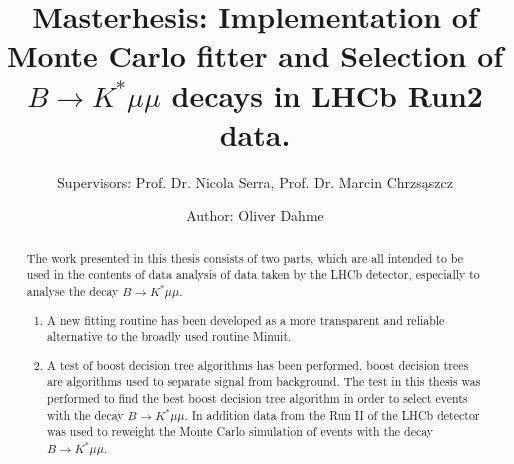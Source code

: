 \documentclass[english]{uzhpub}
\begin{document}
\title{Masterhesis:
Implementation of Monte Carlo fitter and Selection of $B \rightarrow K^* \mu \mu$ decays in LHCb Run2 data.}
\subtitle{Supervisors: Prof. Dr. Nicola Serra, Prof. Dr. Marcin Chrzs\k{a}szcz}

\author{Author: Oliver Dahme}


\maketitle




\begin{abstract}
  The work presented in this thesis consists of two parts, which are all intended to be used in the contents of data analysis of data taken by the LHCb detector, especially to analyse the decay $B \rightarrow K^* \mu \mu$.
  \begin{enumerate}
    \item A new fitting routine has been developed as a more transparent and reliable alternative to the broadly used routine Minuit.
    \item A test of boost decision tree algorithms has been performed. boost decision trees are algorithms used to separate signal from background. The test in this thesis was performed to find the best boost decision tree algorithm in order to select events with the decay $B \rightarrow K^* \mu \mu$. In addition data from the Run II of the LHCb detector was used to reweight the Monte Carlo simulation of events with the decay $B \rightarrow K^* \mu \mu$.
  \end{enumerate}
\end{abstract}

\clearpage

\tableofcontents



\clearpage
\end{document}
